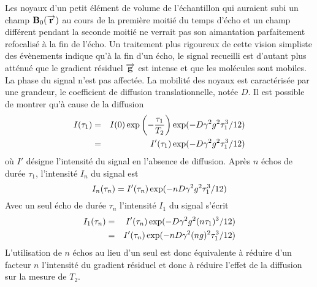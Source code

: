 Les noyaux d'un petit élément de volume de l'échantillon
qui auraient subi un champ $\mathbf{B}_0(\overrightarrow{\mathbf{r}})$ au cours de la première moitié
du temps d'écho et un champ différent pendant la seconde moitié ne
verrait pas son aimantation parfaitement refocalisé à la fin de l'écho.
Un traitement plus rigoureux de cette vision simpliste des évènements
indique qu'à la fin d'un écho, le signal
recueilli est d'autant plus atténué que le gradient résiduel $\overrightarrow{\mathbf{g}}$ est intense
et que les molécules sont mobiles.
La phase du signal n'est pas affectée.
La mobilité des noyaux est caractérisée par une grandeur, le coefficient de diffusion
translationnelle, notée $D$.
Il est possible de montrer qu'à cause de la diffusion
\begin{eqnarray}
I(\tau_1) & = & I(0) \exp\left(-\frac{\tau_1}{T_2}\right)
\exp(-D\gamma^2g^2\tau_1^3/12) \\
& = & I'(\tau_1) \exp(-D\gamma^2g^2\tau_1^3/12)
\end{eqnarray}
où $I'$ désigne l'intensité du signal en l'absence de diffusion.
Après $n$ échos de durée $\tau_1$, l'intensité $I_n$ du signal est
\begin{equation}
I_n(\tau_n) = I'(\tau_n) \exp(-nD\gamma^2g^2\tau_1^3/12)
\end{equation}
Avec un seul écho de durée $\tau_n$ l'intensité $I_1$ du signal s'écrit
\begin{eqnarray}
I_1(\tau_n) & = & I'(\tau_n) \exp(-D\gamma^2g^2(n\tau_1)^3/12)\\
& = & I'(\tau_n) \exp(-nD\gamma^2(ng)^2\tau_1^3/12)
\end{eqnarray}
L'utilisation de $n$ échos au lieu d'un seul
est donc équivalente à réduire d'un facteur $n$
l'intensité du gradient résiduel et donc à réduire l'effet de la diffusion
sur la mesure de $T_2$.
